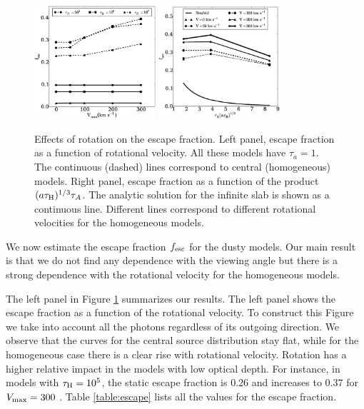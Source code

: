\documentclass{emulateapj}
\newcommand{\kms}{{\ifmmode{{\mathrm{\,km\ s}^{-1}}}\else{\,km~s$^{-1}$}\fi}}
\begin{document}
\begin{figure}
\begin{center}
  \includegraphics[width=0.40\textwidth]{f6.eps}
  \includegraphics[width=0.40\textwidth]{f7.eps}
\end{center}
  \caption{Effects of rotation on the escape fraction. Left
    panel, escape fraction as a function of rotational velocity. All
    these models have $\tau_{a}=1$. The continuous (dashed) lines
    correspond to central (homogeneous) models. Right panel, escape
    fraction as a    function of the product $(a\tau_{\rm
      H})^{1/3}\tau_{A}$. The    analytic solution for the infinite
    slab is shown as a continuous    line. Different lines correspond
    to different rotational velocities for the homogeneous models.     
    \label{fig:escape_fraction}} 
\end{figure}

We now estimate the escape fraction $f_{\rm esc}$ for the dusty models. Our main
result is that we do not find any dependence with the viewing angle
but there is a strong dependence with the rotational velocity for the
homogeneous models.

The left panel in Figure \ref{fig:escape_fraction} summarizes our
results. The left panel shows the escape fraction as a function of the
rotational velocity. To construct this Figure we take into account all
the photons regardless of its outgoing direction. We observe that the
curves for the central source distribution stay flat, while for the
homogeneous case there is a clear rise with rotational velocity.
Rotation has a higher relative impact in the models with low optical
depth. For instance, in models with $\tau_{\rm H}=10^5$, the static
escape fraction is $0.26$ and increases to $0.37$ for $V_{\rm
  max}=300$ \kms. Table \ref{table:escape} lists all the values for
the escape fraction.   
\end{document}
